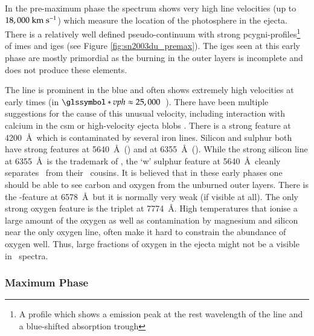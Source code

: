 In the pre-maximum phase the spectrum shows very high line velocities (up to $18,000~\textrm{km}~\textrm{s}^{-1}$) which measure the location of the photosphere in the ejecta. There is a relatively well defined pseudo-continuum with strong \gls{pcygni}-profiles\footnote{A profile which shows a emission peak at the rest wavelength of the line and a blue-shifted absorption trough} of \glspl{ime} and \glspl{ige} (see Figure \ref{fig:sn2003du_premax}). The \glspl{ige} seen at this early phase are mostly primordial as the burning in the outer layers  is incomplete and does not produce these elements. 




The  line is prominent in the blue and often shows extremely high velocities at early times (in  $\vph \approx 25,000$~\kms). There have been multiple suggestions for the cause of this unusual velocity, including interaction with calcium in the \gls{csm} or high-velocity ejecta blobs \citep{1999ApJ...525..881H,2004ApJ...607..391G,2004ApJ...601.1019T,2005ApJ...623L..37M,2006ApJ...636..400Q,2006ApJ...645..470T,2007A&A...471..527G}. There is a strong  feature at 4200~\AA\ which is contaminated by several iron lines. Silicon and sulphur both have strong features at 5640~\AA\ () and at 6355~\AA\ (). While the strong silicon line at 6355~\AA\ is the trademark of \sneia, the `w' sulphur feature at 5640~\AA\ cleanly separates \sneia\ from their \sneibc\ cousins. It is believed that in these early phases one should be able to see carbon and oxygen from the unburned outer layers. There is the -feature at 6578~\AA\ but it is normally very weak (if visible at all). The only strong oxygen feature is the  triplet at 7774~\AA. High temperatures that ionise a large amount of the oxygen as well as contamination by magnesium and silicon near the only oxygen line, often make it hard to constrain the abundance of oxygen well. Thus, large fractions of oxygen in the ejecta might not be a visible in \sneia\ spectra. 

\subsubsection{Maximum Phase} 


